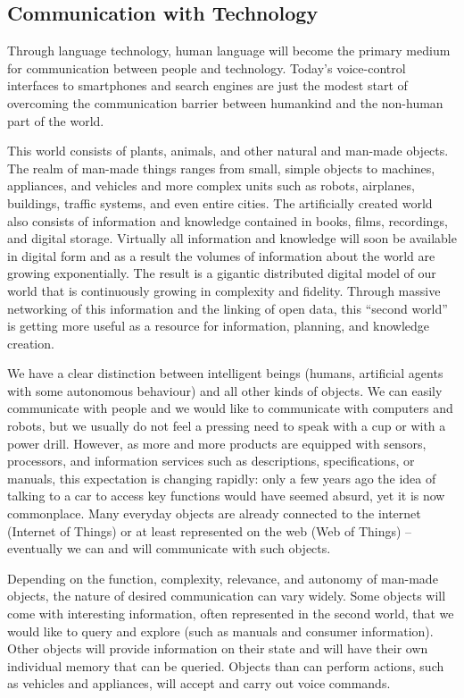 \documentclass[10pt, plain]{../../metanetpaper}
\begin{document}
\begin{multicols}{2}
\subsection{Communication with Technology}
\label{sec:comm-with-techn}

Through language technology, human language will become the primary medium for communication between people and technology. Today’s voice-control interfaces to smartphones and search engines are just the modest start of overcoming the communication barrier between humankind and the non-human part of the world.

This world consists of plants, animals, and other natural and man-made objects. The realm of man-made things ranges from small, simple objects to machines, appliances, and vehicles and more complex units such as robots, airplanes, buildings, traffic systems, and even entire cities. The artificially created world also consists of information and knowledge contained in books, films, recordings, and digital storage. Virtually all information and knowledge will soon be available in digital form and as a result the volumes of information about the world are growing exponentially. The result is a gigantic distributed digital model of our world that is continuously growing in complexity and fidelity. Through massive networking of this information and the linking of open data, this “second world” is getting more useful as a resource for information, planning, and knowledge creation.
 
We have a clear distinction between intelligent beings (humans, artificial agents with some autonomous behaviour) and all other kinds of objects. We can easily communicate with people and we would like to communicate with computers and robots, but we usually do not feel a pressing need to speak with a cup or with a power drill. However, as more and more products are equipped with sensors, processors, and information services such as descriptions, specifications, or manuals, this expectation is changing rapidly: only a few years ago the idea of talking to a car to access key functions would have seemed absurd, yet it is now commonplace. Many everyday objects are already connected to the internet (Internet of Things) or at least represented on the web (Web of Things) -- eventually we can and will communicate with such objects.
 
Depending on the function, complexity, relevance, and autonomy of man-made objects, the nature of desired communication can vary widely. Some objects will come with interesting information, often represented in the second world, that we would like to query and explore (such as manuals and consumer information). Other objects will provide information on their state and will have their own individual memory that can be queried. Objects than can perform actions, such as vehicles and appliances, will accept and carry out voice commands.


\end{multicols}
\end{document}
